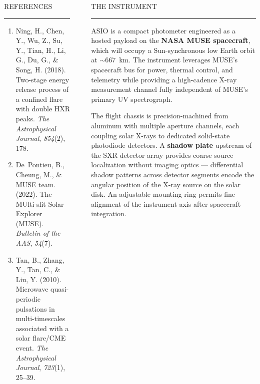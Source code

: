 \documentclass[final]{beamer}
\newcommand{\sectitle}[1]{%
  {\usebeamerfont{block title}\color{accentdark}\MakeUppercase{#1}}%
  \par\nointerlineskip\vspace{2pt}%
  {\color{accent}\rule{\linewidth}{1.5pt}}%
  \par\vspace{4pt}%
}
\newlength{\sepwidth}
\newlength{\leftcolwidth}
\newlength{\midcolwidth}
\newcommand{\separatorcolumn}{\begin{column}{\sepwidth}\end{column}}
\begin{document}
\begin{frame}[t]
\begin{columns}[t, totalwidth=\paperwidth]
\begin{column}{\leftcolwidth}
\begin{tcolorbox}[glassy]
\sectitle{References}
\color{textmid}
\scriptsize
\begin{enumerate}[leftmargin=16pt, itemsep=3pt,
    label={\textcolor{accent}{\bfseries\arabic*.}}]
  \item Ning, H., Chen, Y., Wu, Z., Su, Y., Tian, H., Li, G., Du, G.,
    \& Song, H. (2018). Two-stage energy release process of a confined
    flare with double HXR peaks. \textit{The Astrophysical Journal},
    \textit{854}(2), 178.
  \item De~Pontieu, B., Cheung, M., \& MUSE team. (2022). The MUlti-slit
    Solar Explorer (MUSE). \textit{Bulletin of the AAS}, \textit{54}(7).
  \item Tan, B., Zhang, Y., Tan, C., \& Liu, Y. (2010). Microwave
    quasi-periodic pulsations in multi-timescales associated with a
    solar flare/CME event. \textit{The Astrophysical Journal},
    \textit{723}(1), 25--39.
\end{enumerate}
\end{tcolorbox}

\end{column}
\separatorcolumn

\begin{column}{\midcolwidth}

\begin{tcolorbox}[glassy]
\sectitle{The Instrument}

ASIO is a compact photometer engineered as a hosted payload on the
\textbf{\textcolor{accentdark}{NASA MUSE spacecraft}}, which will occupy
a Sun-synchronous low Earth orbit at $\sim$667~km. The instrument leverages
MUSE's spacecraft bus for power, thermal control, and telemetry while
providing a high-cadence X-ray measurement channel fully independent of
MUSE's primary UV spectrograph.

The flight chassis is precision-machined from aluminum with multiple
aperture channels, each coupling solar X-rays to dedicated solid-state
photodiode detectors. A \textbf{\textcolor{accentdark}{shadow plate}}
upstream of the SXR detector array provides coarse source localization
without imaging optics --- differential shadow patterns across detector
segments encode the angular position of the X-ray source on the solar
disk. An adjustable mounting ring permits fine alignment of the instrument
axis after spacecraft integration.


\end{tcolorbox}
\end{column}
\end{columns}
\end{frame}
\end{document}
